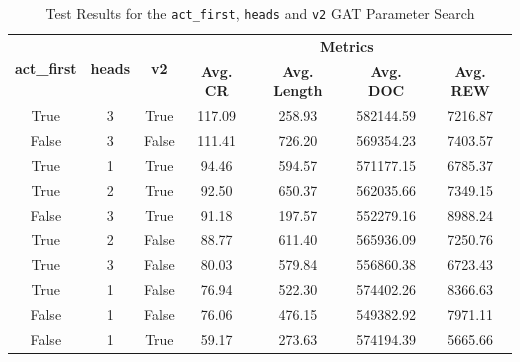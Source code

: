 \begin{table}[h!]
	\centering
	\caption{Test Results for the \texttt{act\_first}, \texttt{heads} and \texttt{v2} \ac{GAT} Parameter Search}
	\begin{tabular}{ccccccc}
		\toprule
		\multirow{2}{*}{\textbf{act\_first}} & \multirow{2}{*}{\textbf{heads}} & \multirow{2}{*}{\textbf{v2}} & \multicolumn{4}{c}{\textbf{Metrics}} \\ 
		\cmidrule(lr){4-7}
		&  &  & \textbf{Avg. CR} & \textbf{Avg. Length} & \textbf{Avg. DOC} & \textbf{Avg. REW} \\ 
		\midrule
		True  & 3 & True  & 117.09 & 258.93 & 582144.59 & 7216.87 \\ 
		False & 3 & False & 111.41 & 726.20 & 569354.23 & 7403.57 \\ 
		True  & 1 & True  & 94.46  & 594.57 & 571177.15 & 6785.37 \\ 
		True  & 2 & True  & 92.50  & 650.37 & 562035.66 & 7349.15 \\ 
		False & 3 & True  & 91.18  & 197.57 & 552279.16 & 8988.24 \\ 
		True  & 2 & False & 88.77  & 611.40 & 565936.09 & 7250.76 \\ 
		True  & 3 & False & 80.03  & 579.84 & 556860.38 & 6723.43 \\ 
		True  & 1 & False & 76.94  & 522.30 & 574402.26 & 8366.63 \\ 
		False & 1 & False & 76.06  & 476.15 & 549382.92 & 7971.11 \\ 
		False & 1 & True  & 59.17  & 273.63 & 574194.39 & 5665.66 \\ 
		\bottomrule
	\end{tabular}
	\label{tab:tune-gat}
\end{table}

